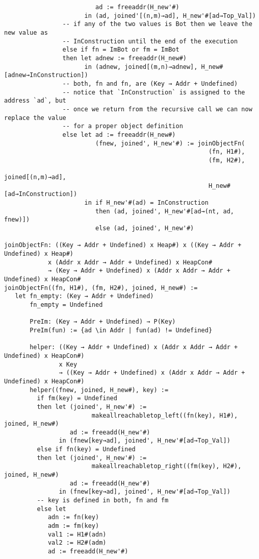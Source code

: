 \begin{verbatim}
                         ad := freeaddr(H_new'#)
                      in (ad, joined'[(n,m)→ad], H_new'#[ad→Top_Val])
                -- if any of the two values is Bot then we leave the new value as
                -- InConstruction until the end of the execution
                else if fn = ImBot or fm = ImBot
                then let adnew := freeaddr(H_new#)
                      in (adnew, joined[(m,n)→adnew], H_new#[adnew→InConstruction])
                -- both, fn and fn, are (Key → Addr + Undefined)
                -- notice that `InConstruction` is assigned to the address `ad`, but
                -- once we return from the recursive call we can now replace the value
                -- for a proper object definition
                else let ad := freeaddr(H_new#)
                         (fnew, joined', H_new'#) := joinObjectFn(
                                                        (fn, H1#),
                                                        (fm, H2#),
                                                        joined[(n,m)→ad],
                                                        H_new#[ad→InConstruction])
                      in if H_new'#(ad) = InConstruction
                         then (ad, joined', H_new'#[ad→(nt, ad, fnew)])
                         else (ad, joined', H_new'#)

joinObjectFn: ((Key → Addr + Undefined) x Heap#) x ((Key → Addr + Undefined) x Heap#)
            x (Addr x Addr → Addr + Undefined) x HeapCon#
            → (Key → Addr + Undefined) x (Addr x Addr → Addr + Undefined) x HeapCon#
joinObjectFn((fn, H1#), (fm, H2#), joined, H_new#) :=
   let fn_empty: (Key → Addr + Undefined)
       fn_empty = Undefined

       PreIm: (Key → Addr + Undefined) → P(Key)
       PreIm(fun) := {ad \in Addr | fun(ad) != Undefined}

       helper: ((Key → Addr + Undefined) x (Addr x Addr → Addr + Undefined) x HeapCon#)
               x Key
               → ((Key → Addr + Undefined) x (Addr x Addr → Addr + Undefined) x HeapCon#)
       helper((fnew, joined, H_new#), key) :=
         if fm(key) = Undefined
         then let (joined', H_new'#) :=
                        makeallreachabletop_left((fn(key), H1#), joined, H_new#)
                  ad := freeadd(H_new'#)
               in (fnew[key→ad], joined', H_new'#[ad→Top_Val])
         else if fn(key) = Undefined
         then let (joined', H_new'#) :=
                        makeallreachabletop_right((fm(key), H2#), joined, H_new#)
                  ad := freeadd(H_new'#)
               in (fnew[key→ad], joined', H_new'#[ad→Top_Val])
         -- key is defined in both, fn and fm
         else let
            adn := fn(key)
            adm := fm(key)
            val1 := H1#(adn)
            val2 := H2#(adm)
            ad := freeadd(H_new'#)


\end{verbatim}
